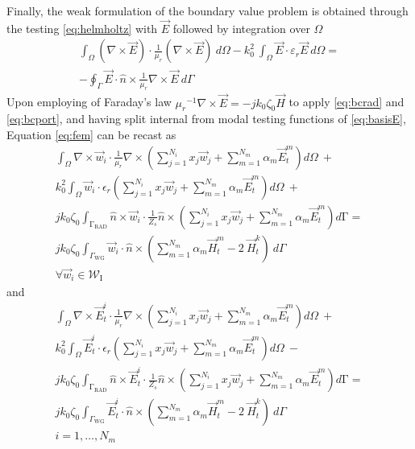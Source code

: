 \documentclass[AMA,STIX2COL]{WileyNJD-v2}
\begin{document}
Finally, the weak formulation of the boundary value problem is obtained through the testing \eqref{eq:helmholtz} with $\vec{E}$ followed by integration over $\Omega$
%
\begin{multline}
\label{eq:fem}
\int_\Omega (\nabla \times \vec{E})  \cdot \frac{1}{\mu_r}(\nabla \times \vec{E}) \ d\Omega
- k_0^2 \ \int_\Omega \vec{E}  \cdot \varepsilon_r \vec{E} \ d\Omega = \\ 
- \oint_{\Gamma} \vec{E}  \cdot \hat{n} \times \frac{1}{\mu_r} \nabla \times \vec{E} \ d\Gamma 
\end{multline} 
%
Upon employing of Faraday's law ${\mu_r} ^{-1} \nabla \times \vec{E} = - j k_0 \zeta_0 \vec{H}$  to apply \eqref{eq:bcrad} and \eqref{eq:bcport}, and having split internal from modal testing functions of \eqref{eq:basisE}, Equation \eqref{eq:fem} can be recast as
\begin{multline}
\label{eq:FEMformTFE1}
\int_\Omega \nabla \times \vec{w}_i \cdot \frac{1}{\mu_r} \nabla \times \left( \sum_{j=1}^{N_i} x_j \vec{w}_j + \sum_{m=1}^{N_m} \alpha_m \vec{E}_t^m \right) d\Omega \ +\\
 k_0^2 \int_\Omega \vec{w}_i \cdot \epsilon_r \left( \sum_{j=1}^{N_i} x_j \vec{w}_j + \sum_{m=1}^{N_m} \alpha_m \vec{E}_t^m \right) d\Omega \ +\\
 j k_0 \zeta_0 \int_{\mathrm{\Gamma}_\text{RAD}} \hat{n} \times \vec{w}_i \cdot \frac{1}{Z_s} \hat{n} \times \left( \sum_{j=1}^{N_i} x_j \vec{w}_j + \sum_{m=1}^{N_m} \alpha_m \vec{E}_t^m \right) d\mathrm{\Gamma} =\\ 
 j k_0 \zeta_0 \int_{\Gamma_\text{WG}}  \vec{w}_i \cdot \hat{n} \times \left( \sum_{m=1}^{N_m} \alpha_m \vec{H}_t^m - 2 \ \vec{H}_t^k \right) \ d\Gamma\\
\forall \vec{w}_i \in \mathcal{W}_\text{I}
\end{multline}
%
\noindent and
%
\begin{multline}
\label{eq:FEMformTFE2}
\int_\Omega \nabla \times \vec{E}_t^{i} \cdot \frac{1}{\mu_r} \nabla \times \left( \sum_{j=1}^{N_i} x_j \vec{w}_j + \sum_{m=1}^{N_m} \alpha_m \vec{E}_t^m \right)  d\Omega \ +\\
 k_0^2 \int_\Omega \vec{E}_t^{i} \cdot \epsilon_r \left( \sum_{j=1}^{N_i} x_j \vec{w}_j + \sum_{m=1}^{N_m} \alpha_m \vec{E}_t^m \right) d\Omega \ - \\ 
j k_0 \zeta_0 \int_{\mathrm{\Gamma}_\text{RAD}} \hat{n} \times \vec{E}_t^{i} \cdot \frac{1}{Z_s} \hat{n} \times \left( \sum_{j=1}^{N_i} x_j \vec{w}_j + \sum_{m=1}^{N_m} \alpha_m \vec{E}_t^m \right) d\mathrm{\Gamma} = \\
 j k_0 \zeta_0 \int_{\Gamma_\text{WG}}  \vec{E}_t^{i} \cdot \hat{n} \times \left( \sum_{m=1}^{N_m} \alpha_m \vec{H}_t^m - 2 \ \vec{H}_t^k \right) \ d\Gamma\\
i = 1, \ldots, N_m
\end{multline}
\end{document}
